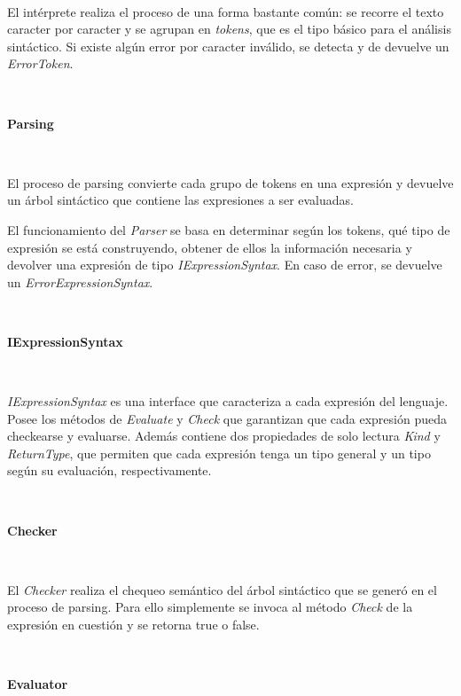 \documentclass{article}
\begin{document}
\


El intérprete realiza el proceso de una forma bastante común: se recorre el texto caracter por 
caracter y se agrupan en \textit{tokens}, que es el tipo básico para el análisis sintáctico. Si existe algún error
por caracter inválido, se detecta y de devuelve un \textit{ErrorToken}. 


\ 


\begin{center}
	\large\textbf{Parsing}
\end{center}




\


El proceso de parsing convierte cada grupo de tokens en una expresión y devuelve un árbol sintáctico que contiene las
expresiones a ser evaluadas.


El funcionamiento del \textit{Parser} se basa en determinar según los tokens, qué tipo de expresión se está construyendo, 
obtener de ellos la información necesaria y devolver una expresión de tipo \textit{IExpressionSyntax}. En caso de error,
se devuelve un \textit{ErrorExpressionSyntax}.


\ 


\begin{center}
	\large\textbf{IExpressionSyntax}
\end{center}


\


\textit{IExpressionSyntax} es una interface que caracteriza a cada expresión del lenguaje. Posee los métodos de 
\textit{Evaluate} y  \textit{Check} que garantizan que cada expresión pueda checkearse y evaluarse. Además contiene
dos propiedades de solo lectura \textit{Kind} y \textit{ReturnType}, que permiten que cada expresión tenga un tipo 
general y un tipo según su evaluación, respectivamente.


\


\begin{center}
	\large\textbf{Checker}
\end{center}


\


El \textit{Checker} realiza el chequeo semántico del árbol sintáctico que se generó en el proceso de parsing. Para
ello simplemente se invoca al método \textit{Check} de la expresión en cuestión y se retorna true o false. 


\ 


\begin{center}
	\large\textbf{Evaluator}
\end{center}
\end{document}

